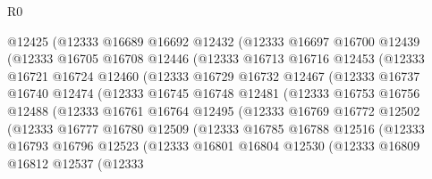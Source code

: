 \begin{lexlean}{R0}
\begin{coremodule}
                @12425
                (@12333
                  @16689
                  @16692
                  @12432
                  (@12333
                    @16697
                    @16700
                    @12439
                    (@12333
                      @16705
                      @16708
                      @12446
                      (@12333
                        @16713
                        @16716
                        @12453
                        (@12333
                          @16721
                          @16724
                          @12460
                          (@12333
                            @16729
                            @16732
                            @12467
                            (@12333
                              @16737
                              @16740
                              @12474
                              (@12333
                                @16745
                                @16748
                                @12481
                                (@12333
                                  @16753
                                  @16756
                                  @12488
                                  (@12333
                                    @16761
                                    @16764
                                    @12495
                                    (@12333
                                      @16769
                                      @16772
                                      @12502
                                      (@12333
                                        @16777
                                        @16780
                                        @12509
                                        (@12333
                                          @16785
                                          @16788
                                          @12516
                                          (@12333
                                            @16793
                                            @16796
                                            @12523
                                            (@12333
                                              @16801
                                              @16804
                                              @12530
                                              (@12333
                                                @16809
                                                @16812
                                                @12537
                                                (@12333

\end{coremodule}
\end{lexlean}
